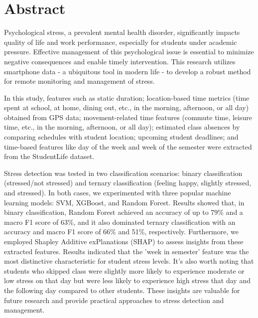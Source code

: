 \section*{Abstract}
\thispagestyle{empty}
\fontsize{13}{16}
\selectfont
Psychological stress, a prevalent mental health disorder, significantly impacts quality of life and work performance, especially for students under academic pressure. Effective management of this psychological issue is essential to minimize negative consequences and enable timely intervention. This research utilizes smartphone data - a ubiquitous tool in modern life - to develop a robust method for remote monitoring and management of stress.

In this study, features such as static duration; location-based time metrics (time spent at school, at home, dining out, etc., in the morning, afternoon, or all day) obtained from GPS data; movement-related time features (commute time, leisure time, etc., in the morning, afternoon, or all day); estimated class absences by comparing schedules with student location; upcoming student deadlines; and time-based features like day of the week and week of the semester were extracted from the StudentLife dataset.

Stress detection was tested in two classification scenarios: binary classification (stressed/not stressed) and ternary classification (feeling happy, slightly stressed, and stressed). In both cases, we experimented with three popular machine learning models: SVM, XGBoost, and Random Forest. Results showed that, in binary classification, Random Forest achieved an accuracy of up to 79\% and a macro F1 score of 63\%, and it also dominated ternary classification with an accuracy and macro F1 score of 66\% and 51\%, respectively. Furthermore, we employed Shapley Additive exPlanations (SHAP) to assess insights from these extracted features. Results indicated that the 'week in semester' feature was the most distinctive characteristic for student stress levels. It's also worth noting that students who skipped class were slightly more likely to experience moderate or low stress on that day but were less likely to experience high stress that day and the following day compared to other students. These insights are valuable for future research and provide practical approaches to stress detection and management.

\clearpage
{}
